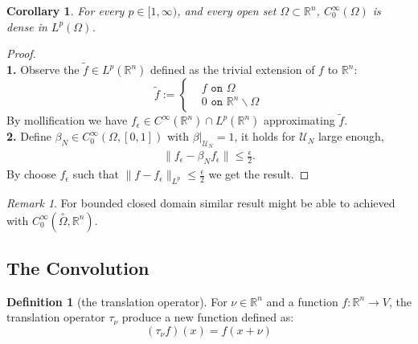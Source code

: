 \documentclass[a4paper,11pt,fleqn]{book}
\newtheorem{corollary}{Corollary}[theorem]
\theoremstyle{definition}
\newtheorem{definition}{Definition}[section]
\theoremstyle{remark}
\newtheorem*{remark}{Remark}
\begin{document}
\begin{corollary}
	For every $p \in [1, \infty)$, and every open set $\Omega \subset \mathbb{R}^n$, $C_0^\infty(\Omega)$ is dense in $L^p(\Omega)$. 
\end{corollary}
\begin{proof}
\quad\\
\textbf{1.} Observe the  $\tilde{f} \in L^p(\mathbb{R}^n)$ defined as the trivial extension of $f$ to $\mathbb{R}^n$: 
\begin{equation*}
\tilde{f}:=\left\{ 
\begin{aligned}
	& f \texttt{ on } \Omega\\
	& 0 \texttt{ on } \mathbb{R}^n \backslash\Omega
\end{aligned}
\right.
\end{equation*}
By mollification we have $f_\epsilon \in C^\infty(\mathbb{R}^n) \cap L^p(\mathbb{R}^n)$ approximating $\tilde{f}$. 
\quad\\
\textbf{2.} Define $\beta_N \in C^\infty_0( \Omega, [0, 1])$ with $\beta|_{\mathcal{U}_N} = 1$, it holds for $\mathcal{U}_N$ large enough, 
\begin{align*}
	\|f_\epsilon - \beta_N f_\epsilon \| \le \frac{\epsilon}{2}. 
\end{align*} 
By choose $f_\epsilon$ such that $\|f - f_\epsilon \|_{L^p} \le \frac{\epsilon}{2}$ we get the result. 
\end{proof}
\begin{remark}
For bounded closed domain similar result might be able to achieved with $C_0^\infty(\overset{\circ}{\Omega}, \mathbb{R}^n)$. 	
\end{remark}

\subsection{The Convolution}
\begin{definition}[the translation operator]
	For $\nu \in \mathbb{R}^n$ and a function $f :\mathbb{R}^n \rightarrow V$, the translation operator $\tau_\nu$ produce a new function defined as:
	\begin{equation*}
		(\tau_\nu f) (x) = f(x + \nu)
	\end{equation*}
\end{definition}
\end{document}

